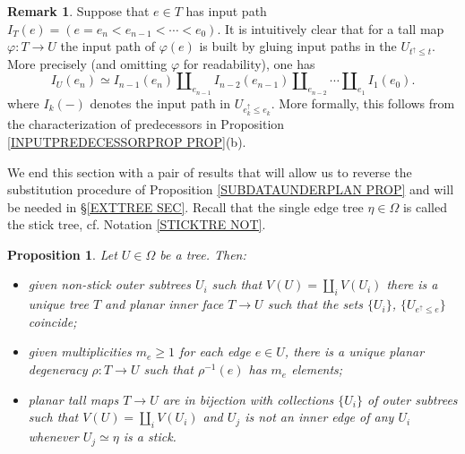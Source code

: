 \documentclass[a4paper,10pt
,draft
]{article}%
\numberwithin{equation}{section}
\numberwithin{figure}{section}
\newtheorem{proposition}[equation]{Proposition}%
\theoremstyle{definition} %
\newtheorem{remark}[equation]{Remark}%
\newcommand{\1}{\ensuremath{\mathbbm 1}}%
\begin{document}
\begin{remark}\label{INPPATH REM}
Suppose that $e \in T$ has input path
$I_T(e) = (e=e_n < e_{n-1} < \cdots < e_0)$.
It is intuitively clear that for a tall map 
$\varphi \colon T \to U$ the input path of $\varphi(e)$ is built by gluing input paths in the $U_{t^{\uparrow} \leq t}$. More precisely (and omitting $\varphi$ for readability), one has
\[
	I_U\left(e_n \right) \simeq 
	I_{n-1}(e_n) \amalg_{e_{n-1}} I_{n-2}(e_{n-1})
	\amalg_{e_{n-2}} \cdots
	\amalg_{e_1} I_1(e_0).
\]
where $I_k(\minus)$ denotes the input path in $U_{e_k^{\uparrow} \leq e_k}$.
More formally, this follows from the characterization of 
predecessors in Proposition \ref{INPUTPREDECESSORPROP PROP}(b).
\end{remark}


We end this section with a pair of results that will allow us to reverse the substitution procedure of 
Proposition \ref{SUBDATAUNDERPLAN PROP}
and will be needed in \S \ref{EXTTREE SEC}.
Recall that the single edge tree $\eta \in \Omega$ is called the stick tree,
cf. Notation \ref{STICKTRE NOT}.

\begin{proposition}\label{BUILDABLE PROP}
	Let $U \in \Omega$ be a tree. Then:
\begin{itemize}
	\item[(i)] given non-stick outer subtrees $U_i$ such that 
	$V(U) = \coprod_i V(U_i)$ there is a unique tree $T$ and planar inner face $T \to U$ such that the sets $\{U_i\}$, $\{U_{e^{\uparrow}\leq e}\}$ coincide;
	\item[(ii)] given multiplicities $m_e \geq 1$ for each edge $e \in U$, there is a unique planar degeneracy $\rho \colon T \to U$ such that $\rho^{-1}(e)$ has $m_e$ elements;
	\item[(iii)] planar tall maps $T \to U$ are in bijection with collections $\{U_i\}$ of outer subtrees such that $V(U) = \coprod_i V(U_i)$ and $U_j$ is not an inner edge of any $U_i$ whenever $U_j \simeq \eta$ is a stick.
\end{itemize}
\end{proposition}
\end{document}
